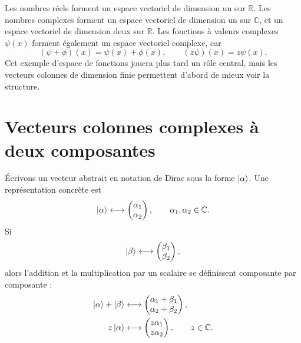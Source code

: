 Les nombres réels forment un espace vectoriel de dimension un sur \(\mathbb R\). Les nombres complexes forment un espace vectoriel de dimension un sur \(\mathbb C\), et un espace vectoriel de dimension deux sur \(\mathbb R\). Les fonctions à valeurs complexes \(\psi(x)\) forment également un espace vectoriel complexe, car
\begin{equation}
  (\psi+\phi)(x)=\psi(x)+\phi(x),
  \qquad
  (z\psi)(x)=z\psi(x).
\end{equation}
Cet exemple d’espace de fonctions jouera plus tard un rôle central, mais les vecteurs colonnes de dimension finie permettent d’abord de mieux voir la structure.

\begin{classroomqa}
\end{classroomqa}

\section{Vecteurs colonnes complexes à deux composantes}

Écrivons un vecteur abstrait en notation de Dirac sous la forme \(\left\lvert\alpha\right\rangle\). Une représentation concrète est
\begin{equation}
  \left\lvert\alpha\right\rangle
  \longleftrightarrow
  \begin{pmatrix}
    \alpha_1\\
    \alpha_2
  \end{pmatrix},
  \qquad
  \alpha_1,\alpha_2\in\mathbb C.
\end{equation}
Si
\begin{equation}
  \left\lvert\beta\right\rangle
  \longleftrightarrow
  \begin{pmatrix}
    \beta_1\\
    \beta_2
  \end{pmatrix},
\end{equation}
alors l’addition et la multiplication par un scalaire se définissent composante par composante :
\begin{align}
  \left\lvert\alpha\right\rangle+\left\lvert\beta\right\rangle
  &\longleftrightarrow
  \begin{pmatrix}
    \alpha_1+\beta_1\\
    \alpha_2+\beta_2
  \end{pmatrix},\\
  z\left\lvert\alpha\right\rangle
  &\longleftrightarrow
  \begin{pmatrix}
    z\alpha_1\\
    z\alpha_2
  \end{pmatrix},
  \qquad z\in\mathbb C.
\end{align}

